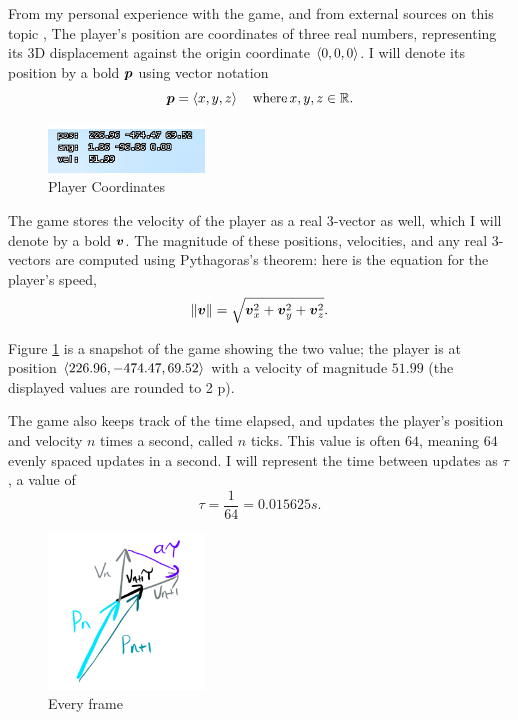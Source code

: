 From my personal experience with the game, and from external sources on this topic \parencite{Kered13}, The player's position are coordinates of three real numbers, representing its 3D displacement against the origin coordinate $\left\langle 0,0,0 \right\rangle$. I will denote its position by a bold $\boldsymbol{p}$ using vector notation
\[
    \boldsymbol{p} = \left\langle x, y, z \right\rangle \quad \text{where} \, x, y, z \in  \mathbb{R}.
\]

\begin{figure}
    \includegraphics[width=0.37\textwidth,right]{assets/1coords.png}
    \caption{Player Coordinates}
    \label{fig:1coords}
\end{figure}

The game stores the velocity of the player as a real 3-vector as well, which I will denote by a bold $\boldsymbol{v}$. The magnitude of these positions, velocities, and any real 3-vectors are computed using Pythagoras's theorem: here is the equation for the player's speed,
\[
    \|\boldsymbol{v}\| = \sqrt{\boldsymbol{v}_x^2+\boldsymbol{v}_y^2+\boldsymbol{v}_z^2}.
\]


Figure \ref{fig:1coords} is a snapshot of the game showing the two value; the player is at position $\left\langle 226.96, -474.47, 69.52 \right\rangle$ with a velocity of magnitude $51.99$ (the displayed values are rounded to 2 p).


The game also keeps track of the time elapsed, and updates the player's position and velocity $n$ times a second, called $n$ ticks. This value is often $64$, meaning $64$ evenly spaced updates in a second. I will represent the time between updates as $\tau$, a value of
\[
    \tau = \frac{1}{64} = 0.015625 \si{s}.
\]

\begin{figure}
    \includegraphics[width=0.37\textwidth,right]{assets/1vecadd.png}
    \caption{Every frame}
    \label{fig:1vecadd}
\end{figure}

